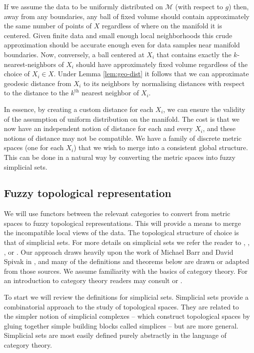 \documentclass[12pt]{article}
\begin{document}
If we assume the data to be uniformly distributed on $\mathcal{M}$ (with respect to $g$) then, away from any boundaries, any ball of fixed volume should contain approximately the same number of points of $X$ regardless of where on the manifold it is centered. Given finite data and small enough local neighborhoods this crude approximation should be accurate enough even for data samples near manifold boundaries. Now, conversely, a ball centered at $X_i$ that contains exactly the $k$-nearest-neighbors of $X_i$ should have approximately fixed volume regardless of the choice of $X_i \in X$. Under Lemma \ref{lem:geo-dist} it follows that we can approximate geodesic distance from $X_i$ to its neighbors by normalising distances with respect to the distance to the $k^{\text{th}}$ nearest neighbor of $X_i$.

In essence, by creating a custom distance for each $X_i$, we can ensure the validity of the assumption of uniform distribution on the manifold. The cost is that we now have an independent notion of distance for each and every $X_i$, and these notions of distance may not be compatible. We have a family of discrete metric spaces (one for each $X_i$) that we wish to merge into a consistent global structure. This can be done in a natural way by converting the metric spaces into fuzzy simplicial sets.

\subsection{Fuzzy topological representation}\label{kernel_derivation}

We will use functors between the relevant categories to convert from metric spaces to fuzzy topological representations. This will provide a means to merge the incompatible local views of the data. The topological structure of choice is that of simplicial sets. For more details on simplicial sets we refer the reader to \cite{goerss2009simplicial}, \cite{may1992simplicial}, \cite{riehl2011leisurely}, or \cite{friedman2012survey}. Our approach draws heavily upon the work of Michael Barr \cite{barr1986fuzzy} and David Spivak in \cite{spivakmetric}, and many of the definitions and theorems below are drawn or adapted from those sources. We assume familiarity with the basics of category theory. For an introduction to category theory readers may consult \cite{mac2013categories} or \cite{riehl2017category}.

To start we will review the definitions for simplicial sets. Simplicial sets provide a combinatorial approach to the study of topological spaces. They are related to the simpler notion of simplicial complexes -- which construct topological spaces by gluing together simple building blocks called simplices -- but are more general. Simplicial sets are most easily defined purely abstractly in the language of category theory.
\end{document}
